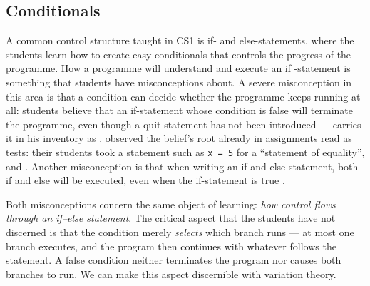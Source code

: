 \mode*
\subsection{Conditionals}

A common control structure taught in CS1 is if- and else-statements, where
the students learn how to create easy conditionals that controls the
progress of the programme. How a programme will understand and execute an if
-statement is something that students have misconceptions about. A severe
misconception in this area is that a condition can decide whether the
programme keeps running at all: students believe that an if-statement
whose condition is false will terminate the programme, even though a
quit-statement has not been introduced --- \textcite{Sorva2012Dissertation}
carries it in his inventory as . \textcite{Plass2015Variables} observed the belief's root already
in assignments read as tests: their students took a statement such as
\texttt{x = 5} for a \enquote{statement of equality}, and
.
Another misconception is that when writing an if and else statement, both 
if and else will be executed, even when the if-statement is true \autocite{
MisconceptionsSurvey2017}.

Both misconceptions concern the same object of learning: \emph{how control flows
through an if--else statement}. The critical aspect that the students have not
discerned is that the condition merely \emph{selects} which branch runs --- at
most one branch executes, and the program then continues with whatever follows
the statement. A false condition neither terminates the program nor causes both
branches to run. We can make this aspect discernible with variation theory.

